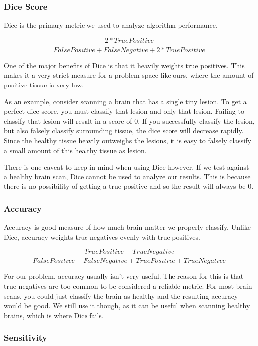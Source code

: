 \documentclass{article} %
\begin{document}
\subsubsection{Dice Score}
Dice is the primary metric we used to analyze algorithm performance. 

$$\frac{2*True Positive}{False Positive + False Negative + 2*True Positive}$$

One of the major benefits of Dice is that it heavily weights true positives. This makes it a very strict measure for a problem space like ours, where the amount of positive tissue is very low. 

As an example, consider scanning a brain that has a single tiny lesion. To get a perfect dice score, you must classify that lesion and only that lesion. Failing to classify that lesion will result in a score of 0. If you successfully classify the lesion, but also falsely classify surrounding tissue, the dice score will decrease rapidly. Since the healthy tissue heavily outweighs the lesions, it is easy to falsely classify a small amount of this healthy tissue as lesion.

There is one caveat to keep in mind when using Dice however. If we test against a healthy brain scan, Dice cannot be used to analyze our results. This is because there is no possibility of getting a true positive and so the result will always be 0.

\subsubsection{Accuracy}
Accuracy is good measure of how much brain matter we properly classify. Unlike Dice, accuracy weights true negatives evenly with true positives.

$$\frac{True Positive + True Negative}{False Positive + False Negative + True Positive + True Negative}$$

For our problem, accuracy usually isn't very useful. The reason for this is that true negatives are too common to be considered a reliable metric. For most brain scans, you could just classify the brain as healthy and the resulting accuracy would be good. We still use it though, as it can be useful when scanning healthy brains, which is where Dice fails.

\subsubsection{Sensitivity}
\end{document}
